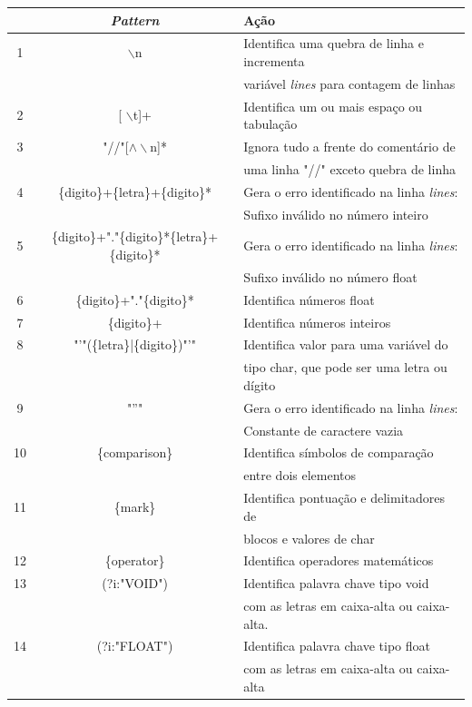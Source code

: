 \documentclass[12pt]{article}
\begin{document}
\begin{table}
 \centering
 \begin{tabular}{|c || c  l |} 
 \hline
   & \textit{Pattern} & Ação \\ [0.5ex] 
 \hline \hline
 1 & $\backslash$n	& Identifica uma quebra de linha e incrementa \\&& variável \textit{lines} para contagem de linhas \\ 
 \hline
 2 & [ $\backslash$t]+ 	& Identifica um ou mais espaço ou tabulação\\
 \hline
 3 & "//"[$\wedge\backslash$n]* & Ignora tudo a frente do comentário de \\&& uma linha "//" exceto quebra de linha \\
 \hline
 4 & \{digito\}+\{letra\}+\{digito\}* & {\color{red}Gera o erro identificado na linha \textit{lines}:} \\&& {\color{red}Sufixo inválido no número inteiro} \\
 \hline
 5 & {\footnotesize \{digito\}+"."\{digito\}*\{letra\}+\{digito\}*} & {\color{red}Gera o erro identificado na linha \textit{lines}:} \\&& {\color{red}Sufixo inválido no número float} \\
 \hline
 6 & \{digito\}+"."\{digito\}* & Identifica números float\\
 \hline
 7 & \{digito\}+ & Identifica números inteiros\\
 \hline
 8 & "'"(\{letra\}|\{digito\})"'" & Identifica valor para uma variável do \\&& tipo char, que pode ser uma letra ou dígito\\
 \hline
 9 & "''" & {\color{red}Gera o erro identificado na linha \textit{lines}:} \\&& {\color{red}Constante de caractere vazia} \\
 \hline 
 10 & \{comparison\} & Identifica símbolos de comparação \\&& entre dois elementos \\
 \hline
 11 & \{mark\} & Identifica pontuação e delimitadores de \\&& blocos e valores de char\\
 \hline
 12 & \{operator\} & Identifica operadores matemáticos \\
 \hline
 13 & (?i:"VOID")& Identifica palavra chave tipo void \\&& com as letras em caixa-alta ou caixa-alta. \\
 \hline
 14 & (?i:"FLOAT")& Identifica palavra chave tipo float \\&& com as letras em caixa-alta ou caixa-alta \\

\end{tabular}
\end{table}
\end{document}
